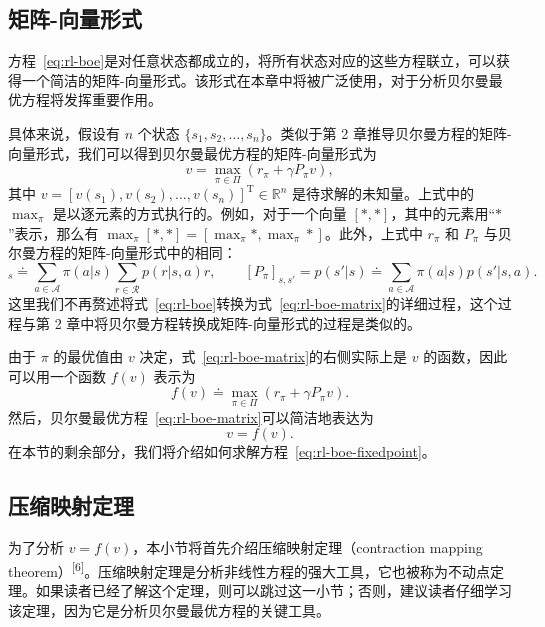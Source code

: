 \subsection{矩阵-向量形式}
\label{sec:rl-bellman-opt-matrix}

方程~\eqref{eq:rl-boe}是对任意状态都成立的，将所有状态对应的这些方程联立，可以获得一个简洁的矩阵-向量形式。该形式在本章中将被广泛使用，对于分析贝尔曼最优方程将发挥重要作用。

具体来说，假设有 $n$ 个状态 $\{s_1, s_2, \ldots, s_n\}$。类似于第 2 章推导贝尔曼方程的矩阵-向量形式，我们可以得到贝尔曼最优方程的矩阵-向量形式为
\begin{equation}
  v = \max_{\pi \in \varPi} (r_\pi + \gamma P_\pi v),
\label{eq:rl-boe-matrix}
\end{equation}
其中 $v = [v(s_1), v(s_2), \ldots, v(s_n)]^{\mathrm{T}} \in \mathbb{R}^n$ 是待求解的未知量。上式中的 $\max_\pi$ 是以逐元素的方式执行的。例如，对于一个向量 $[*, *]$，其中的元素用“$*$”表示，那么有 $\max_\pi[*, *] = [\max_\pi *, \max_\pi *]$。此外，上式中 $r_\pi$ 和 $P_\pi$ 与贝尔曼方程的矩阵-向量形式中的相同：
\begin{equation}
  [r_\pi]_s \doteq \sum_{a \in \mathcal{A}} \pi(a|s) \sum_{r \in \mathcal{R}} p(r|s,a) r, \qquad [P_\pi]_{s, s'} = p(s'|s) \doteq \sum_{a \in \mathcal{A}} \pi(a|s) p(s'|s,a).
\end{equation}
这里我们不再赘述将式~\eqref{eq:rl-boe}转换为式~\eqref{eq:rl-boe-matrix}的详细过程，这个过程与第 2 章中将贝尔曼方程转换成矩阵-向量形式的过程是类似的。

由于 $\pi$ 的最优值由 $v$ 决定，式~\eqref{eq:rl-boe-matrix}的右侧实际上是 $v$ 的函数，因此可以用一个函数 $f(v)$ 表示为
\begin{equation}
  f(v) \doteq \max_{\pi \in \varPi} (r_\pi + \gamma P_\pi v).
\end{equation}
然后，贝尔曼最优方程~\eqref{eq:rl-boe-matrix}可以简洁地表达为
\begin{equation}
  v = f(v).
\label{eq:rl-boe-fixedpoint}
\end{equation}
在本节的剩余部分，我们将介绍如何求解方程~\eqref{eq:rl-boe-fixedpoint}。

\subsection{压缩映射定理}
\label{sec:rl-bellman-opt-contraction}

为了分析 $v = f(v)$，本小节将首先介绍压缩映射定理（contraction mapping theorem）\textsuperscript{[6]}。压缩映射定理是分析非线性方程的强大工具，它也被称为不动点定理。如果读者已经了解这个定理，则可以跳过这一小节；否则，建议读者仔细学习该定理，因为它是分析贝尔曼最优方程的关键工具。

